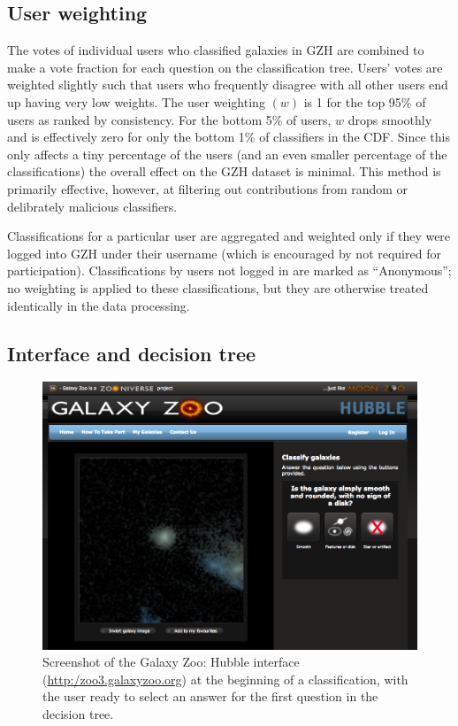 \documentclass[twocolumn]{aastex6}
\begin{document}
\subsection{User weighting}\label{ssec:weighting}
The votes of individual users who classified galaxies in GZH are combined to make a vote fraction for each question on the classification tree. Users' votes are weighted slightly \citep[in a method identical to that described in][]{wil13} such that users who frequently disagree with all other users end up having very low weights. The user weighting $(w)$ is 1 for the top 95\% of users as ranked by consistency. For the bottom 5\% of users, $w$ drops smoothly and is effectively zero for only the bottom 1\% of classifiers in the CDF. Since this only affects a tiny percentage of the users (and an even smaller percentage of the classifications) the overall effect on the GZH dataset is minimal. This method is primarily effective, however, at filtering out contributions from random or delibrately malicious classifiers.

Classifications for a particular user are aggregated and weighted only if they were logged into GZH under their username (which is encouraged by not required for participation). Classifications by users not logged in are marked as ``Anonymous''; no weighting is applied to these classifications, but they are otherwise treated identically in the data processing. 

\subsection{Interface and decision tree}\label{ssec:interface}

\begin{figure}
\center
\includegraphics[width=160mm]{figures/gzh_interface.png}
\caption{Screenshot of the Galaxy Zoo: Hubble interface (\url{http:/zoo3.galaxyzoo.org}) at the beginning of a classification, with the user ready to select an answer for the first question in the decision tree.\label{fig:interface}}
\end{figure}
\end{document}
